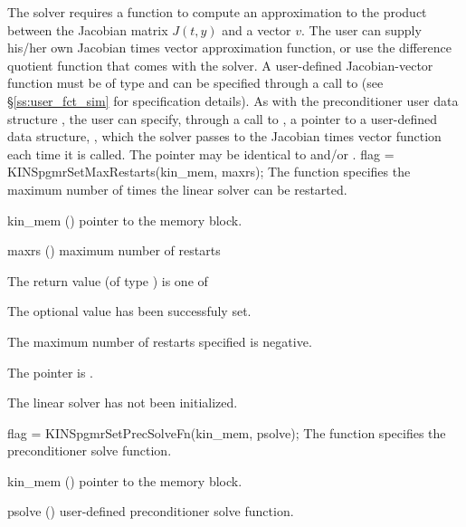 The 
{\kinspgmr} solver requires a function to compute an approximation to the
product between the Jacobian matrix $J(t,y)$ and a vector $v$.
The user can supply his/her own Jacobian times vector approximation function, 
or use the difference quotient function  
that comes with the {\kinspgmr} solver.
A user-defined Jacobian-vector function must be of type  and 
can be specified through a call to  
(see \S\ref{ss:user_fct_sim} for specification details).
As with the preconditioner user data structure , 
the user can specify, through a call to , a pointer to a 
user-defined data structure, , which
the {\kinspgmr} solver passes to the Jacobian times vector function  each
time it is called.  
The pointer  may be identical to  and/or .
{
  flag = KINSpgmrSetMaxRestarts(kin\_mem, maxrs);
}
{
  The function  specifies the maximum
  number of times the {\spgmr} linear solver can be restarted.
}
{
  \begin{args}
  \item[kin\_mem] ()
    pointer to the {\kinsol} memory block.
  \item[maxrs] ()
    maximum number of restarts
  \end{args}
}
{
  The return value  (of type ) is one of
  \begin{args}
  \item[\Id{KINSPGMR\_SUCCESS}] 
    The optional value has been successfuly set.
  \item[\Id{KINSPGMR\_ILL\_INPUT}]
    The maximum number of restarts specified is negative.
  \item[\Id{KINSPGMR\_MEM\_NULL}]
    The  pointer is .
  \item[\Id{KINSPGMR\_LMEM\_NULL}]
    The {\kinspgmr} linear solver has not been initialized.
  \end{args}
}
{}
{
  flag = KINSpgmrSetPrecSolveFn(kin\_mem, psolve);
}
{
  The function  specifies the preconditioner
  solve function.
}
{
  \begin{args}
  \item[kin\_mem] ()
    pointer to the {\kinsol} memory block.
  \item[psolve] ()
    user-defined preconditioner solve function.
  \end{args}
}
